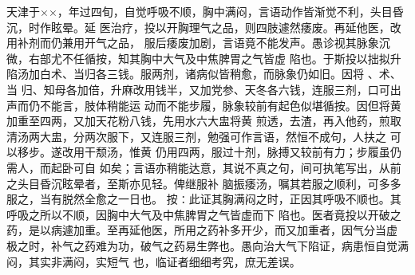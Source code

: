 \documentclass[a4paper,12pt,UTF8,twoside]{ctexbook}
\begin{document}
天津于××，年过四旬，自觉呼吸不顺，胸中满闷，言语动作皆渐觉不利，头目昏沉，时作眩晕。延 
医治疗，投以开胸理气之品，则四肢遽然痿废。再延他医，改用补剂而仍兼用开气之品， 
服后痿废加剧，言语竟不能发声。愚诊视其脉象沉微，右部尤不任循按，知其胸中大气及中焦脾胃之气皆虚 
陷也。于斯投以拙拟升陷汤加白术、当归各三钱。服两剂，诸病似皆稍愈，而脉象仍如旧。因将 、术、当 
归、知母各加倍，升麻改用钱半，又加党参、天冬各六钱，连服三剂，口可出声而仍不能言，肢体稍能运 
动而不能步履，脉象较前有起色似堪循按。因但将黄 加重至四两，又加天花粉八钱，先用水六大盅将黄 
煎透，去渣，再入他药，煎取清汤两大盅，分两次服下，又连服三剂，勉强可作言语，然恒不成句，人扶之 
可以移步。遂改用干颓汤，惟黄 仍用四两，服过十剂，脉搏又较前有力；步履虽仍需人，而起卧可自 
如矣；言语亦稍能达意，其说不真之句，间可执笔写出，从前之头目昏沉眩晕者，至斯亦见轻。俾继服补 
脑振痿汤，嘱其若服之顺利，可多多服之，当有脱然全愈之一日也。 
按∶此证其胸满闷之时，正因其呼吸不顺也。其呼吸之所以不顺，因胸中大气及中焦脾胃之气皆虚而下 
陷也。医者竟投以开破之药，是以病遽加重。至再延他医，所用之药补多开少，而又加重者，因气分当虚 
极之时，补气之药难为功，破气之药易生弊也。愚向治大气下陷证，病患恒自觉满闷，其实非满闷，实短气 
也，临证者细细考究，庶无差误。 
\end{document}
